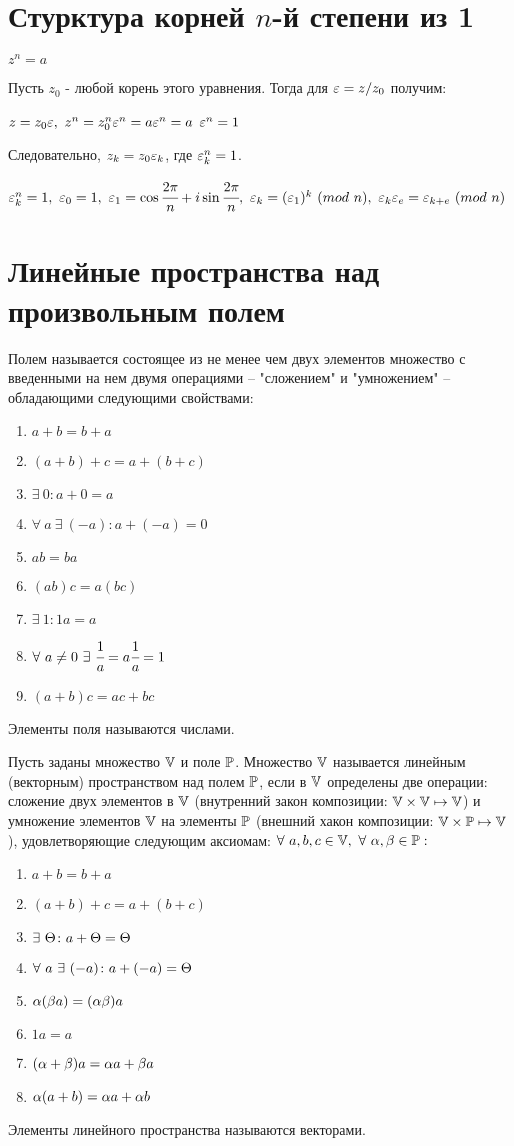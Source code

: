 \section{Стурктура корней $n$-й степени из 1}
$z^n=a$

Пусть $z_0$ - любой корень этого уравнения. Тогда для $\eps=z/z_0$ получим:

$z=z_0\eps,\ z^n=z_0^n\eps^n=a\eps^n=a$ \then $\eps^n=1$

Следовательно, $z_k=z_0\eps_k$, где $\eps_k^n=1$.

$\eps_k^n=1,\ \eps_0=1,\ \eps_1=\cos\cfrac{2\pi}n+i\sin\cfrac{2\pi}n,\ \eps_k=(\eps_1)^k\ (mod\ n),\ \eps_k\eps_e=\eps_{k+e}\ (mod\ n)$
\section{Линейные пространства над произвольным полем}
\begin{opred}
Полем называется состоящее из не менее чем двух элементов множество с введенными на нем двумя операциями -- "сложением" и "умножением" -- обладающими следующими свойствами:
\begin{enumerate}
\item $a+b=b+a$
\item $(a+b)+c=a+(b+c)$
\item $\exists\ 0\colon a+0=a$
\item $\forall\ a\ \exists\ (-a)\colon a+(-a)=0$
\item $ab=ba$
\item $(ab)c=a(bc)$
\item $\exists\ 1\colon 1a=a$
\item $\forall\ a\neq0\ \exists\ \cfrac1a=a\cfrac1a=1$
\item $(a+b)c=ac+bc$
\end{enumerate}
\end{opred}
\begin{remark}
Элементы поля называются числами.
\end{remark}
\begin{opred}
Пусть заданы множество $\V$ и поле $\P$. Множество $\V$ называется линейным (векторным) пространством над полем $\P$, если в $\V$ определены две операции: сложение двух элементов в $\V$ (внутренний закон композиции: $\V\times\V\mapsto\V$) и умножение элементов $\V$ на элементы $\P$ (внешний хакон композиции: $\V\times\P\mapsto\V$), удовлетворяющие следующим аксиомам: $\forall\ a,b,c\in\V,\ \forall\ \alpha,\beta\in\P:$
\begin{enumerate}
\item $a+b=b+a$
\item $(a+b)+c=a+(b+c)$
\item $\exists\ \T\colon a+\T=\T$
\item $\forall\ a\ \exists\ (-a)\colon a+(-a)=\T$
\item $\a(\b a)=(\a\b)a$
\item $1a=a$
\item $(\a+\b)a=\a a+\b a$
\item $\a(a+b)=\a a+\a b$
\end{enumerate}
Элементы линейного пространства называются векторами.
\end{opred}
